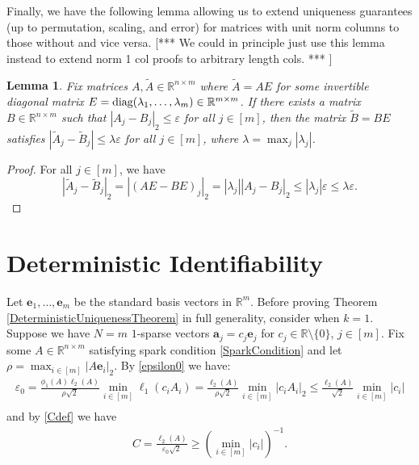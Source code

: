 \documentclass[journal, onecolumn]{IEEEtran}
\newtheorem{lemma}{Lemma}
\begin{document}
Finally, we have the following lemma allowing us to extend uniqueness guarantees (up to permutation, scaling, and error) for matrices with unit norm columns to those without and vice versa.  [*** We could in principle just use this lemma instead to extend norm 1 col proofs to arbitrary length cols. *** ]
\begin{lemma}\label{NormalizedDictionaryLemma}
Fix matrices $A, \tilde{A} \in \mathbb{R}^{n \times m}$ where $\tilde{A} = AE$ for some invertible diagonal matrix $E = \text{\rm diag}(\lambda_1,\ldots,\lambda_m) \in \mathbb{R}^{m \times m}$. If there exists a matrix $B \in \mathbb{R}^{n \times m}$ such that $|A_j - B_j|_2 \leq \varepsilon$ for all $j \in [m]$, then the matrix $\tilde{B} = BE$ satisfies $|\tilde{A}_j - \tilde{B}_j| \leq \lambda \varepsilon$ for all $j \in [m]$, where $\lambda = \max_j |\lambda_j|$.
\end{lemma}
\begin{proof}
For all $j \in [m]$, we have
\[|\tilde{A}_j - \tilde{B}_j|_2 = |(AE-BE)_j|_2 = |\lambda_j| |A_j- B_j|_2 \leq |\lambda_j| \varepsilon \leq \lambda \varepsilon.\]
\end{proof}

 

\section{Deterministic Identifiability}\label{DUT}

Let $\mathbf{e}_1, \ldots, \mathbf{e}_m$ be the standard basis vectors in $\mathbb R^m$.
Before proving Theorem \ref{DeterministicUniquenessTheorem} in full generality, consider when $k=1$. Suppose we have $N = m$ $1$-sparse vectors $\mathbf{a}_j = c_j \mathbf{e}_j$ for $c_j \in \mathbb{R} \setminus \{0\}$, $j \in [m]$. Fix some $A \in \mathbb{R}^{n \times m}$ satisfying spark condition \eqref{SparkCondition} and let $\rho = \max_{i \in [m]} |A\mathbf{e}_i|_2$. By \eqref{epsilon0} we have:
\begin{align}
\varepsilon_0 
= \frac{ \phi_1(A) \ell_{2}(A) }{\rho \sqrt{2}} \min_{i \in [m]} \ell_1(c_iA_i) 
= \frac{\ell_2(A)}{ \rho \sqrt{2}} \min_{i \in [m]}|c_iA_i|_2
\leq \frac{\ell_2(A)}{ \sqrt{2}} \min_{i \in [m]}|c_i| \\
\end{align}
%
and by \eqref{Cdef} we have
\begin{align}
C = \frac{\ell_{2}(A)}{ \varepsilon_0 \sqrt{2}} \geq (\min_{i \in [m]} |c_i|)^{-1}.
\end{align} 
\end{document}
